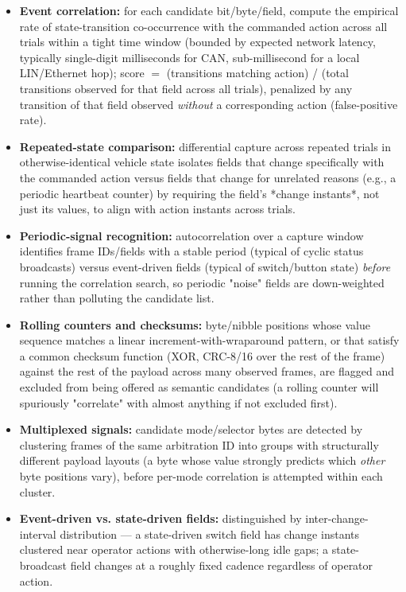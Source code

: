 \begin{itemize}
\item \textbf{Event correlation:} for each candidate bit/byte/field, compute the empirical rate of state-transition co-occurrence with the commanded action across all trials within a tight time window (bounded by expected network latency, typically single-digit milliseconds for CAN, sub-millisecond for a local LIN/Ethernet hop); score $=$ (transitions matching action) / (total transitions observed for that field across all trials), penalized by any transition of that field observed \emph{without} a corresponding action (false-positive rate).
\item \textbf{Repeated-state comparison:} differential capture across repeated trials in otherwise-identical vehicle state isolates fields that change specifically with the commanded action versus fields that change for unrelated reasons (e.g., a periodic heartbeat counter) by requiring the field's *change instants*, not just its values, to align with action instants across trials.
\item \textbf{Periodic-signal recognition:} autocorrelation over a capture window identifies frame IDs/fields with a stable period (typical of cyclic status broadcasts) versus event-driven fields (typical of switch/button state) \emph{before} running the correlation search, so periodic "noise" fields are down-weighted rather than polluting the candidate list.
\item \textbf{Rolling counters and checksums:} byte/nibble positions whose value sequence matches a linear increment-with-wraparound pattern, or that satisfy a common checksum function (XOR, CRC-8/16 over the rest of the frame) against the rest of the payload across many observed frames, are flagged and excluded from being offered as semantic candidates (a rolling counter will spuriously "correlate" with almost anything if not excluded first).
\item \textbf{Multiplexed signals:} candidate mode/selector bytes are detected by clustering frames of the same arbitration ID into groups with structurally different payload layouts (a byte whose value strongly predicts which \emph{other} byte positions vary), before per-mode correlation is attempted within each cluster.
\item \textbf{Event-driven vs. state-driven fields:} distinguished by inter-change-interval distribution --- a state-driven switch field has change instants clustered near operator actions with otherwise-long idle gaps; a state-broadcast field changes at a roughly fixed cadence regardless of operator action.
\end{itemize}

